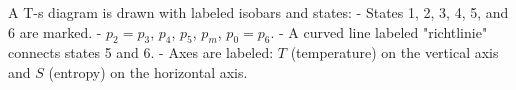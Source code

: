 A T-s diagram is drawn with labeled isobars and states:  
- States 1, 2, 3, 4, 5, and 6 are marked.  
- \( p_2 = p_3 \), \( p_4 \), \( p_5 \), \( p_m \), \( p_0 = p_6 \).  
- A curved line labeled "richtlinie" connects states 5 and 6.  
- Axes are labeled: \( T \) (temperature) on the vertical axis and \( S \) (entropy) on the horizontal axis.